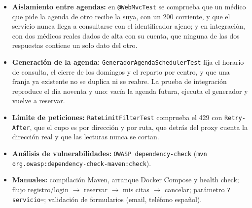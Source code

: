 \documentclass[12pt,a4paper]{report}
\begin{document}
\begin{itemize}
  \item \textbf{Aislamiento entre agendas:} en \texttt{@WebMvcTest} se comprueba que un médico que pide la agenda de otro recibe la suya, con un 200 corriente, y que el servicio nunca llega a consultarse con el identificador ajeno; y en integración, con dos médicos reales dados de alta con su cuenta, que ninguna de las dos respuestas contiene un solo dato del otro.
  \item \textbf{Generación de la agenda:} \texttt{GeneradorAgendaSchedulerTest} fija el horario de consulta, el cierre de los domingos y el reparto por centro, y que una franja ya existente no se duplica ni se reabre. La prueba de integración reproduce el día noventa y uno: vacía la agenda futura, ejecuta el generador y vuelve a reservar.
  \item \textbf{Límite de peticiones:} \texttt{RateLimitFilterTest} comprueba el 429 con \texttt{Retry-After}, que el cupo es por dirección y por ruta, que detrás del proxy cuenta la dirección real y que las lecturas nunca se cortan.
  \item \textbf{Análisis de vulnerabilidades:} \texttt{OWASP dependency-check} (\texttt{mvn org.owasp:dependency-check-maven:check}).
  \item \textbf{Manuales:} compilación Maven, arranque Docker Compose y health check; flujo registro/login $\rightarrow$ reservar $\rightarrow$ mis citas $\rightarrow$ cancelar; parámetro \texttt{?servicio=}; validación de formularios (email, teléfono español).
\end{itemize}
\end{document}
